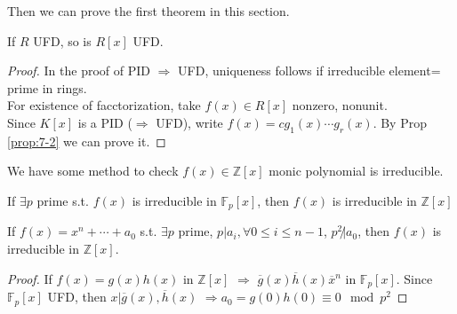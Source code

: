 Then we can prove the first theorem in this section.
\begin{theorem}
    If  $ R  $ UFD, so is  $ R[x] $ UFD.
\end{theorem}
\begin{proof}
    In the proof of PID $ \Rightarrow  $ UFD, uniqueness follows if irreducible element= prime in rings.\\
    For existence of facctorization, take  $ f(x)\in R[x] $ nonzero, nonunit.\\
    Since  $ K[x] $ is a PID ($\Rightarrow  $ UFD), write  $ f(x)=cg_1(x)\cdots g_r(x) $. By Prop \ref{prop:7-2} we can prove it. 
\end{proof}
We have some method to check  $ f(x)\in \mathbb{Z}[x] $ monic polynomial is irreducible.
\begin{proposition}
    If  $\exists p  $ prime s.t.  $ f(x)  $ is irreducible in  $ \mathbb{F}_p[x] $, then  $ f(x)  $ is irreducible in  $ \mathbb{Z}[x]  $  
\end{proposition}

\begin{proposition}
    If  $ f(x)=x^n+\cdots+a_0 $ s.t.  $ \exists p  $ prime,  $ p|a_i,\forall 0 \leq i \leq n-1 $,  $ p^2\not|a_0 $, then  $ f(x) $ is irreducible in  $ \mathbb{Z}[x] $.    
\end{proposition}
\begin{proof}
    If  $ f(x)=g(x)h(x) $ in  $ \mathbb{Z}[x] $ $ \Rightarrow  $  $ \overline{g}(x)\overline{h}(x)\overline{x}^n $ in  $ \mathbb{F}_p[x] $. Since  $ \mathbb{F}_p[x] $ UFD, then  $ x|\overline{g}(x),\overline{h}(x) $ $ \Rightarrow a_0=g(0)h(0)\equiv 0\mod p^2 $      
\end{proof}
